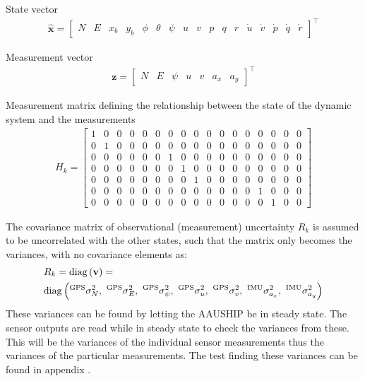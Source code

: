 State vector
\begin{align}
\hat{\mathbf x}=
\begin{bmatrix}
N & E & x_b & y_b & \phi & \theta & \psi & u & v & p & q & r & \dot u & \dot v & \dot p & \dot q & \dot r
\end{bmatrix}^\top
\end{align}

Measurement vector
\begin{align}
\mathbf z=
\begin{bmatrix}
N & E & \psi & u & v & a_x & a_y
\end{bmatrix}^\top
\end{align}

Measurement matrix defining the relationship between the state of the dynamic system and the measurements
\begin{align}
H_k =
\begin{bmatrix}
1 & 0 & 0 & 0 & 0 & 0 & 0 & 0 & 0 & 0 & 0 & 0 & 0 & 0 & 0 & 0 & 0 \\
0 & 1 & 0 & 0 & 0 & 0 & 0 & 0 & 0 & 0 & 0 & 0 & 0 & 0 & 0 & 0 & 0 \\
0 & 0 & 0 & 0 & 0 & 0 & 1 & 0 & 0 & 0 & 0 & 0 & 0 & 0 & 0 & 0 & 0 \\
0 & 0 & 0 & 0 & 0 & 0 & 0 & 1 & 0 & 0 & 0 & 0 & 0 & 0 & 0 & 0 & 0 \\
0 & 0 & 0 & 0 & 0 & 0 & 0 & 0 & 1 & 0 & 0 & 0 & 0 & 0 & 0 & 0 & 0 \\
0 & 0 & 0 & 0 & 0 & 0 & 0 & 0 & 0 & 0 & 0 & 0 & 0 & 1 & 0 & 0 & 0 \\
0 & 0 & 0 & 0 & 0 & 0 & 0 & 0 & 0 & 0 & 0 & 0 & 0 & 0 & 1 & 0 & 0 
\end{bmatrix}
\end{align}

The covariance matrix of observational (measurement) uncertainty $R_k$ is assumed to be uncorrelated with the other states, such that the matrix only becomes the variances, with no covariance elements as:
\begin{align}
&R_k = \diag{\mathbf{v}} =\\ \nonumber
&\diag{^\text{GPS}\sigma_{N}^2,\ ^\text{GPS}\sigma_{E}^2,\ ^\text{GPS}\sigma_{\psi}^2,\ ^\text{GPS}\sigma_{u}^2,\ ^\text{GPS}\sigma_{v}^2,\ ^\text{IMU}\sigma_{a_x}^2,\ ^\text{IMU}\sigma_{a_y}^2}
\end{align}
These variances can be found by letting the AAUSHIP be in steady state. The sensor outputs are read while in steady state to check the variances from these. This will be the variances of the individual sensor measurements thus the variances of the particular measurements. The test finding these variances can be found in appendix .

